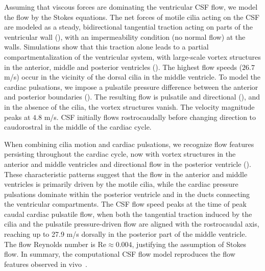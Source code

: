 \documentclass{WileyMSP-template}
\begin{document}
Assuming that viscous forces are dominating the ventricular CSF flow,
we model the flow by the Stokes equations.
The net forces of motile cilia acting on the CSF are modeled as a steady,
bidirectional tangential traction acting on parts of the ventricular wall
(), with an impermeability condition (no normal flow) at the walls.
Simulations show that this traction alone
leads to a partial compartmentalization of the ventricular system,
with large-scale vortex structures in the anterior, middle and
posterior ventricles (). The highest flow
speeds ($26.7$ \textmu m/s) occur in the vicinity of the dorsal cilia
in the middle ventricle. To model the cardiac pulsations, we impose a
pulsatile pressure difference between the anterior and posterior
boundaries (). The resulting flow
is pulsatile and directional (), and
in the absence of the cilia, the vortex structures vanish. The
velocity magnitude peaks at $4.8$ \textmu m/s. CSF initially flows
rostrocaudally before changing direction to caudorostral in the middle
of the cardiac cycle.

When combining cilia motion and cardiac pulsations, we recognize flow features
persisting throughout the cardiac cycle, now with vortex structures in
the anterior and middle ventricles and directional flow in the
posterior ventricle ().
These characteristic patterns suggest that the flow in
the anterior and middle ventricles is primarily driven by the motile
cilia, while the cardiac pressure pulsations dominate within the
posterior ventricle and in the ducts connecting the ventricular
compartments. The CSF flow speed peaks at the time of peak caudal
cardiac pulsatile flow, when both the tangential traction induced by
the cilia and the pulsatile pressure-driven flow are aligned with the
rostrocaudal axis, reaching up to 27.9 \textmu m/s dorsally in the
posterior part of the middle ventricle. The flow Reynolds number is
$\mathrm{Re} \approx 0.004$, justifying the assumption of Stokes
flow. In summary, the computational CSF flow model reproduces the flow
features observed in vivo~\cite{Olstad2019CiliaryDevelopment}.
\end{document}
